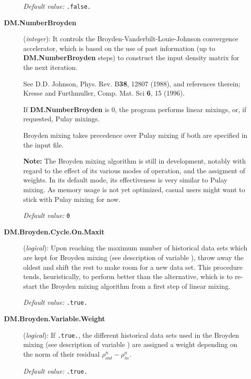 \begin{description}
\textit{Default value:} \texttt{.false.}



\item[\textbf{DM.NumberBroyden}] (\textit{integer}):
It controls the Broyden-Vanderbilt-Louie-Johnson
convergence accelerator, which is based on the use of past information
(up to \textbf{DM.NumberBroyden} steps) to construct the input density
matrix for the next iteration.

See D.D. Johnson, Phys. Rev. B\textbf{38}, 12807 (1988), and references therein;
Kresse and Furthmuller, Comp. Mat. Sci \textbf{6}, 15 (1996).

If \textbf{DM.NumberBroyden} is 0, the program performs linear mixings,
or, if requested, Pulay mixings.

Broyden mixing takes precedence over Pulay mixing if both are
specified in the input file.

\textbf{Note:} The Broyden mixing algorithm is still in development,
notably with regard to the effect of its various modes of operation, and
the assigment of weights. In its default mode, its effectiveness is
very similar to Pulay mixing. As memory usage is not yet optimized,
casual users might want to stick with Pulay mixing for now.

\textit{Default value:} \texttt{0}

\item[\textbf{DM.Broyden.Cycle.On.Maxit}] (\textit{logical}):
Upon reaching the maximum number of historical data sets which are
kept for Broyden mixing (see description of variable ), throw away the oldest and shift the rest to make
room for a new data set. This procedure tends, heuristically, to
perform better than the alternative, which is to re-start the Broyden
mixing algorithm from a first step of linear mixing.

\textit{Default value:} \texttt{.true.}

\item[\textbf{DM.Broyden.Variable.Weight}] (\textit{logical}):
If \texttt{.true.}, the different historical data sets used in
the Broyden mixing (see description of variable ) are assigned a weight depending on the
norm of their residual $\rho^n_{out}-\rho^n_{in}$.

\textit{Default value:} \texttt{.true.}


\end{description}

